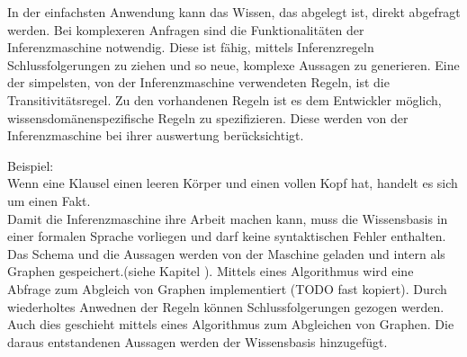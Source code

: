 In der einfachsten Anwendung kann das Wissen, das abgelegt ist, direkt abgefragt werden. Bei komplexeren Anfragen sind die Funktionalitäten der Inferenzmaschine notwendig. Diese ist fähig, mittels Inferenzregeln Schlussfolgerungen zu ziehen und so neue, komplexe Aussagen zu generieren. Eine der simpelsten, von der Inferenzmaschine verwendeten Regeln, ist die Transitivitätsregel. 
Zu den vorhandenen Regeln ist es dem Entwickler möglich, wissensdomänenspezifische Regeln zu spezifizieren. Diese werden von der Inferenzmaschine bei ihrer auswertung berücksichtigt.

Beispiel:\\
\noindent\hspace*{15mm} Wenn eine Klausel einen leeren Körper und einen vollen Kopf hat, handelt es sich um einen Fakt.\\

Damit die Inferenzmaschine ihre Arbeit machen kann, muss die Wissensbasis in einer formalen Sprache vorliegen und darf keine syntaktischen Fehler enthalten. Das Schema und die Aussagen werden von der Maschine geladen und intern als Graphen gespeichert.(siehe Kapitel ). Mittels eines Algorithmus wird eine Abfrage zum Abgleich von Graphen implementiert (TODO fast kopiert). Durch wiederholtes Anwednen der Regeln können Schlussfolgerungen gezogen werden. Auch dies geschieht mittels eines Algorithmus zum Abgleichen von Graphen. Die daraus entstandenen Aussagen werden der Wissensbasis hinzugefügt.



